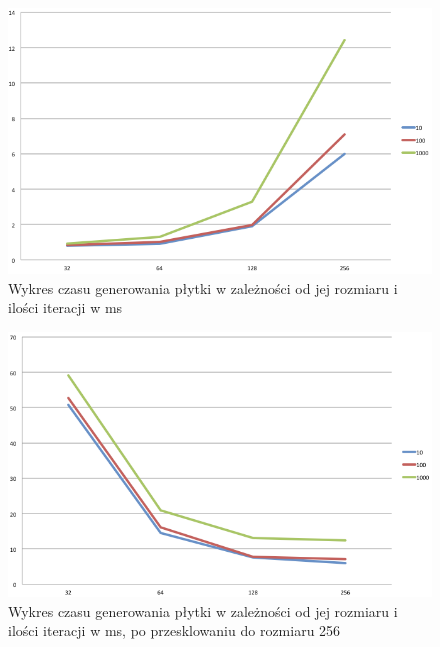 \documentclass[wide,a4paper,titlepage,12pt]{article}
\begin{document}
\begin{figure}[h!]
\begin{center}
\includegraphics[scale=0.6]{plot1.png}
\end{center}
\caption{Wykres czasu generowania płytki w zależności od jej rozmiaru i ilości iteracji w ms}
\label{fig:plot1}
\end{figure}

\begin{figure}[h!]
\begin{center}
\includegraphics[scale=0.6]{plot2.png}
\end{center}
\caption{Wykres czasu generowania płytki w zależności od jej rozmiaru i ilości iteracji w ms, po przesklowaniu do rozmiaru 256}
\label{fig:plot2}
\end{figure}
\end{document}
